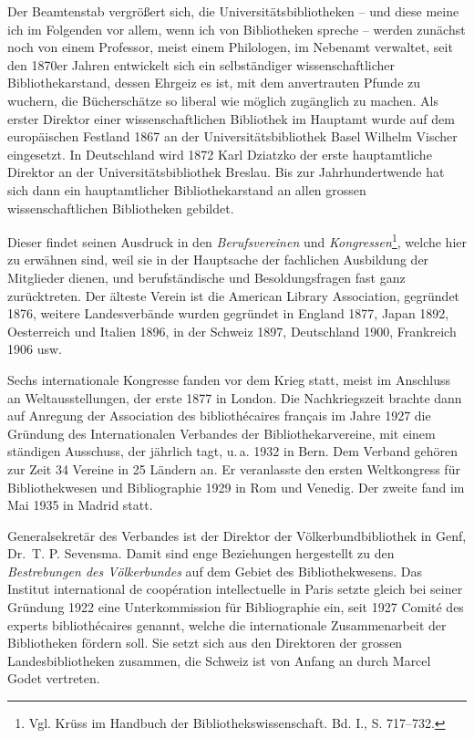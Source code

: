 \documentclass[a4paper,
fontsize=11pt,
oneside,
numbers=noperiodatend,
parskip=half-,
bibliography=totoc,
final
]{scrartcl}
\begin{document}
Der Beamtenstab vergrößert sich, die Universitätsbibliotheken -- und
diese meine ich im Folgenden vor allem, wenn ich von Bibliotheken
spreche -- werden zunächst noch von einem Professor, meist einem
Philologen, im Nebenamt verwaltet, seit den 1870er Jahren entwickelt
sich ein selbständiger wissenschaftlicher Bibliothekarstand, dessen
Ehrgeiz es ist, mit dem anvertrauten Pfunde zu wuchern, die
Bücherschätze so liberal wie möglich zugänglich zu machen. Als erster
Direktor einer wissenschaftlichen Bibliothek im Hauptamt wurde auf dem
europäischen Festland 1867 an der Universitätsbibliothek Basel Wilhelm
Vischer eingesetzt. In Deutschland wird 1872 Karl Dziatzko der erste
hauptamtliche Direktor an der Universitätsbibliothek Breslau. Bis zur
Jahrhundertwende hat sich dann ein hauptamtlicher Bibliothekarstand an
allen grossen wissenschaftlichen Bibliotheken gebildet.

Dieser findet seinen Ausdruck in den \emph{Berufsvereinen} und
\emph{Kongressen}\footnote{Vgl. Krüss im Handbuch der
  Bibliothekswissenschaft. Bd. I., S. 717--732.}, welche hier zu
erwähnen sind, weil sie in der Hauptsache der fachlichen Ausbildung der
Mitglieder dienen, und berufständische und Besoldungsfragen fast ganz
zurücktreten. Der älteste Verein ist die American Library Association,
gegründet 1876, weitere Landesverbände wurden gegründet in England 1877,
Japan 1892, Oesterreich und Italien 1896, in der Schweiz 1897,
Deutschland 1900, Frankreich 1906 usw.

Sechs internationale Kongresse fanden vor dem Krieg statt, meist im
Anschluss an Weltausstellungen, der erste 1877 in London. Die
Nachkriegszeit brachte dann auf Anregung der Association des
bibliothécaires français im Jahre 1927 die Gründung des Internationalen
Verbandes der Bibliothekarvereine, mit einem ständigen Ausschuss, der
jährlich tagt, u.\,a. 1932 in Bern. Dem Verband gehören zur Zeit 34
Vereine in 25 Ländern an. Er veranlasste den ersten Weltkongress für
Bibliothekwesen und Bibliographie 1929 in Rom und Venedig. Der zweite
fand im Mai 1935 in Madrid statt.

Generalsekretär des Verbandes ist der Direktor der Völkerbundbibliothek
in Genf, Dr.~T. P. Sevensma. Damit sind enge Beziehungen hergestellt zu
den \emph{Bestrebungen des Völkerbundes} auf dem Gebiet des
Bibliothekwesens. Das Institut international de coopération
intellectuelle in Paris setzte gleich bei seiner Gründung 1922 eine
Unterkommission für Bibliographie ein, seit 1927 Comité des experts
bibliothécaires genannt, welche die internationale Zusammenarbeit der
Bibliotheken fördern soll. Sie setzt sich aus den Direktoren der grossen
Landesbibliotheken zusammen, die Schweiz ist von Anfang an durch Marcel
Godet vertreten.
\end{document}
